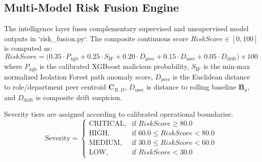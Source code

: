 \documentclass[12pt,a4paper]{report}
\begin{document}
\subsection{Multi-Model Risk Fusion Engine}
The intelligence layer fuses complementary supervised and unsupervised model outputs in `risk_fusion.py`. The composite continuous score $RiskScore \in [0, 100]$ is computed as:
\begin{equation}
    RiskScore = \Big(0.35 \cdot P_{\text{xgb}} + 0.25 \cdot S_{\text{IF}} + 0.20 \cdot D_{\text{peer}} + 0.15 \cdot D_{\text{user}} + 0.05 \cdot D_{\text{drift}}\Big) \times 100
    \label{eq:fusion_formula}
\end{equation}
where $P_{\text{xgb}}$ is the calibrated XGBoost malicious probability, $S_{\text{IF}}$ is the min-max normalized Isolation Forest path anomaly score, $D_{\text{peer}}$ is the Euclidean distance to role/department peer centroid $\mathbf{C}_{R,D}$, $D_{\text{user}}$ is distance to rolling baseline $\mathbf{B}_u$, and $D_{\text{drift}}$ is composite drift suspicion.

Severity tiers are assigned according to calibrated operational boundaries:
\begin{equation}
    \text{Severity} = \begin{cases} \text{CRITICAL}, & \text{if } RiskScore \ge 80.0 \\ \text{HIGH}, & \text{if } 60.0 \le RiskScore < 80.0 \\ \text{MEDIUM}, & \text{if } 30.0 \le RiskScore < 60.0 \\ \text{LOW}, & \text{if } RiskScore < 30.0 \end{cases}
    \label{eq:severity_tiers}
\end{equation}
\end{document}
